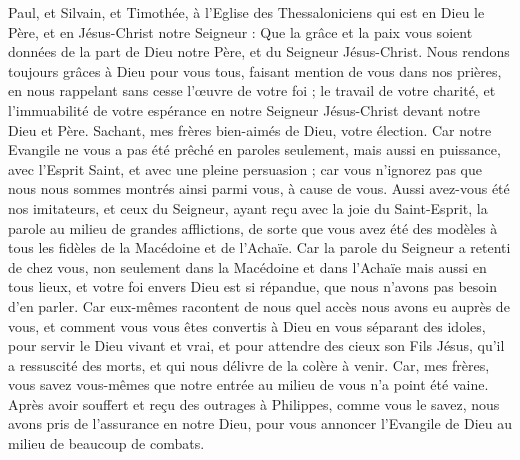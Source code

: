 \begin{multicols}{2}
\VerseOne{}Paul, et Silvain, et Timothée, à l'Eglise des Thessaloniciens qui est en Dieu le Père, et en Jésus-Christ notre Seigneur : Que la grâce et la paix vous soient données de la part de Dieu notre Père, et du Seigneur Jésus-Christ.
Nous rendons toujours grâces à Dieu pour vous tous, faisant mention de vous dans nos prières,
en nous rappelant sans cesse l'œuvre de votre foi ; le travail de votre charité, et l'immuabilité de votre espérance en notre Seigneur Jésus-Christ devant notre Dieu et Père.
Sachant, mes frères bien-aimés de Dieu, votre élection.
Car notre Evangile ne vous a pas été prêché en paroles seulement, mais aussi en puissance, avec l'Esprit Saint, et avec une pleine persuasion ; car vous n'ignorez pas que nous nous sommes montrés ainsi parmi vous, à cause de vous.
Aussi avez-vous été nos imitateurs, et ceux du Seigneur, ayant reçu avec la joie du Saint-Esprit, la parole au milieu de grandes afflictions,
de sorte que vous avez été des modèles à tous les fidèles de la Macédoine et de l'Achaïe.
Car la parole du Seigneur a retenti de chez vous, non seulement dans la Macédoine et dans l'Achaïe mais aussi en tous lieux, et votre foi envers Dieu est si répandue, que nous n'avons pas besoin d'en parler.
Car eux-mêmes racontent de nous quel accès nous avons eu auprès de vous, et comment vous vous êtes convertis à Dieu en vous séparant des idoles, pour servir le Dieu vivant et vrai,
et pour attendre des cieux son Fils Jésus, qu'il a ressuscité des morts, et qui nous délivre de la colère à venir.
\VerseOne{}Car, mes frères, vous savez vous-mêmes que notre entrée au milieu de vous n'a point été vaine. 
Après avoir souffert et reçu des outrages à Philippes, comme vous le savez, nous avons pris de l'assurance en notre Dieu, pour vous annoncer l'Evangile de Dieu au milieu de beaucoup de combats.

\end{multicols}

